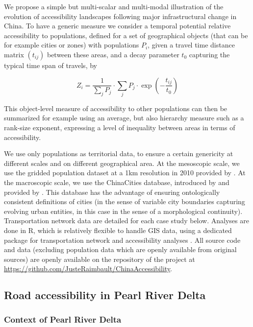 \documentclass[11pt]{article}
\begin{document}
We propose a simple but multi-scalar and multi-modal illustration of the evolution of accessibility landscapes following major infrastructural change in China. To have a generic measure we consider a temporal potential relative accessibility to populations, defined for a set of geographical objects (that can be for example cities or zones) with populations $P_i$, given a travel time distance matrix $(t_{ij})$ between these areas, and a decay parameter $t_0$ capturing the typical time span of travels, by

\[
Z_i = \frac{1}{\sum_j P_j} \cdot \sum_j P_j \cdot \exp{\left(- \frac{t_{ij}}{t_0}\right)}
\]

This object-level measure of accessibility to other populations can then be summarized for example using an average, but also hierarchy measure such as a rank-size exponent, expressing a level of inequality between areas in terms of accessibility.

We use only populations as territorial data, to ensure a certain genericity at different scales and on different geographical area. At the mesoscopic scale, we use the gridded population dataset at a 1km resolution in 2010 provided by \cite{fu2014grid}. At the macroscopic scale, we use the ChinaCities database, introduced by \cite{swerts2013systemes} and provided by \cite{swerts2017database}. This database has the advantage of ensuring ontologically consistent definitions of cities (in the sense of variable city boundaries capturing evolving urban entities, in this case in the sense of a morphological continuity). Transportation network data are detailed for each case study below. Analyses are done in R, which is relatively flexible to handle GIS data, using a dedicated package for transportation network and accessibility analyses \citep{raimbault2018trpackage}. All source code and data (excluding population data which are openly available from original sources) are openly available on the repository of the project at \url{https://github.com/JusteRaimbault/ChinaAccessibility}.





\subsection{Road accessibility in Pearl River Delta}

\subsubsection{Context of Pearl River Delta}
\end{document}

